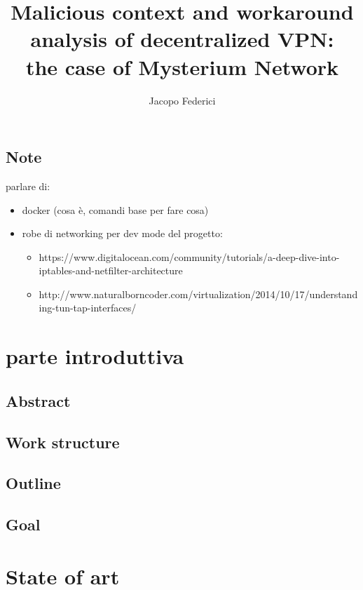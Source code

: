 \documentclass[]{article}
\title{Malicious context and workaround analysis of decentralized VPN:\\the case of Mysterium Network}
\author{Jacopo Federici}
\begin{document}
	\maketitle	
	\clearpage
	
	\tableofcontents{}

	\subsection{Note}
	parlare di:
	\begin{itemize}
		\item docker (cosa è, comandi base per fare cosa)
		\item robe di networking per dev mode del progetto:
		\begin{itemize}
			\item https://www.digitalocean.com/community/tutorials/a-deep-dive-into-iptables-and-netfilter-architecture
			\item http://www.naturalborncoder.com/virtualization/2014/10/17/understanding-tun-tap-interfaces/
		\end{itemize}
	\end{itemize}
	
	\section{parte introduttiva}
		
	\subsection{Abstract}
	\subsection{Work structure}
	\subsection{Outline}
	\subsection{Goal}
	
	
	\section{State of art}
\end{document}
